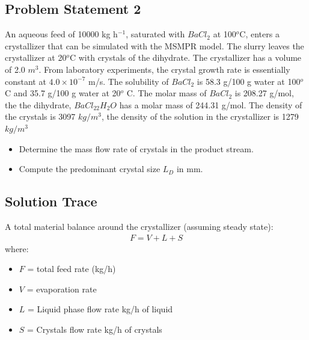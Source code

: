 \documentclass[letterpaper,10pt,english]{jupyterBook}
\begin{document}
\subsection{Problem Statement 2}
\label{\detokenize{Exercise_W8_2021:problem-statement-2}}
\sphinxAtStartPar
An aqueous feed of 10000 kg h\(^{-1}\), saturated with \(BaCl_2\) at 100\(^o\)C, enters a crystallizer that can be simulated with the MSMPR model. The slurry leaves the crystallizer at 20\(^o\)C with crystals of the dihydrate. The crystallizer has a volume of 2.0 \(m^3\). From laboratory experiments, the crystal growth rate is essentially constant at \(4.0\times{10^{-7}}\) m/s. The solubility of \(BaCl_2\) is 58.3 g/100 g water at 100\(^o\) C and 35.7 g/100 g water at 20\(^o\) C. The molar mass of \(BaCl_2\) is 208.27 g/mol, the the dihydrate, \(BaCl_22H_2O\) has a molar mass of 244.31 g/mol. The density of the crystals is 3097 \(kg/m^3\), the density of the solution in the crystallizer is 1279 \(kg/m^3\)
\begin{itemize}
\item {} 
\sphinxAtStartPar
Determine the mass flow rate of crystals in the product stream.

\item {} 
\sphinxAtStartPar
Compute the predominant crystal size \(L_D\) in mm.

\end{itemize}


\subsection{Solution Trace}
\label{\detokenize{Exercise_W8_2021:id1}}
\sphinxAtStartPar
{}

\sphinxAtStartPar
A total material balance around the crystallizer (assuming steady state):
\begin{equation*}
\begin{split}
F=V+L+S
\end{split}
\end{equation*}
\sphinxAtStartPar
where:
\begin{itemize}
\item {} 
\sphinxAtStartPar
\(F\) = total feed rate (kg/h)

\item {} 
\sphinxAtStartPar
\(V\) = evaporation rate

\item {} 
\sphinxAtStartPar
\(L\) = Liquid phase flow rate kg/h of liquid

\item {} 
\sphinxAtStartPar
\(S\) = Crystals flow rate kg/h of crystals

\end{itemize}
\end{document}
